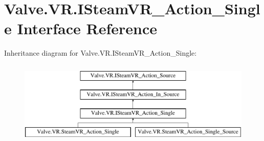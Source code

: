 \hypertarget{interface_valve_1_1_v_r_1_1_i_steam_v_r___action___single}{}\section{Valve.\+V\+R.\+I\+Steam\+V\+R\+\_\+\+Action\+\_\+\+Single Interface Reference}
\label{interface_valve_1_1_v_r_1_1_i_steam_v_r___action___single}
Inheritance diagram for Valve.\+V\+R.\+I\+Steam\+V\+R\+\_\+\+Action\+\_\+\+Single\+:\begin{figure}[H]
\begin{center}
\leavevmode
\includegraphics[height=4.000000cm]{interface_valve_1_1_v_r_1_1_i_steam_v_r___action___single}
\end{center}
\end{figure}
